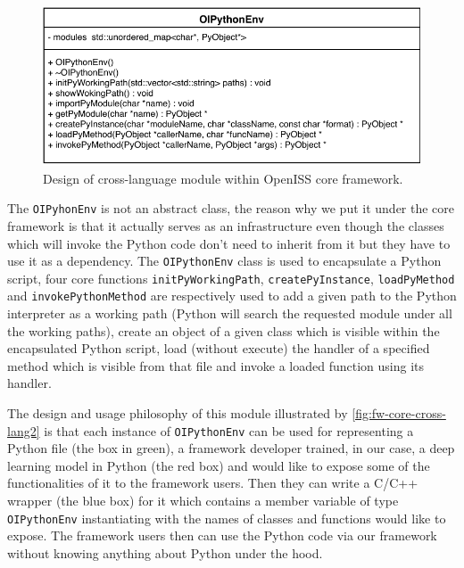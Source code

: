 \begin{figure}
    \centering
    \includegraphics[scale=0.8]{figures/framework_core_cross_lang.pdf}
    \caption{Design of cross-language module within OpenISS core framework.}
    \label{fig:fw-core-cross-lang}
\end{figure}

The \texttt{OIPyhonEnv} is not an abstract class,
the reason why we put it under the core framework is that it actually serves as
an infrastructure even though the classes which will invoke the Python code
don't need to inherit from it but they have to use it as a dependency.
The \texttt{OIPythonEnv} class is used to encapsulate a Python script, four
core functions \texttt{initPyWorkingPath}, \texttt{createPyInstance},
\texttt{loadPyMethod} and \texttt{invokePythonMethod} are respectively used to
add a given path to the Python interpreter as a working path (Python will search
the requested module under all the working paths), create an object of a given
class which is visible within the encapsulated Python script, load (without
execute) the handler of a specified method which is visible from that file and
invoke a loaded function using its handler.

The design and usage philosophy of this module illustrated by
\autoref{fig:fw-core-cross-lang2} is that each instance of \texttt{OIPythonEnv}
can be used for representing a Python file (the box in green), a framework
developer trained, in our case, a deep learning model in Python (the red box)
and would like to expose some of the functionalities of it to the framework
users. Then they can write a C/C++ wrapper (the blue box) for it which
contains a member variable of type \texttt{OIPythonEnv} instantiating with the
names of classes and functions would like to expose. The framework users then
can use the Python code via our framework without knowing anything about Python
under the hood.


